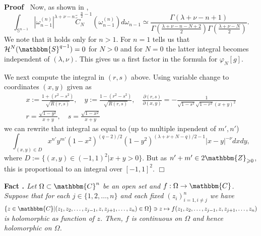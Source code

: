 \documentclass{article}
\newcommand{\assign}{:=}
\newcommand{\tmtextbf}[1]{{\bfseries{#1}}}
\newcommand{\tmtextit}[1]{{\itshape{#1}}}
\newcommand{\tmtextup}[1]{{\upshape{#1}}}
\newenvironment{proof}{\noindent\textbf{Proof\ }}{\hspace*{\fill}$\Box$\medskip}
\numberwithin{definition}{section}
\numberwithin{lemma}{section}
\numberwithin{proposition}{section}
{\theorembodyfont{\rmfamily}\newtheorem{remark}{Remark}
\numberwithin{remark}{section}
}
\begin{document}
\begin{proof}
  Now, as shown in {\cite[lem. 7.6]{kobayashi2015symmetry}},
  \[ \int_{\mathbb{S}^{n - 1}} | \omega_{n - 1}^{(n)} |^{\lambda + \nu - n} 
     \widetilde{\tilde{C}}_N^{\frac{n}{2} - 1} (\omega_{n - 1}^{(n)}) d
     \omega_{n - 1} \simeq \frac{\Gamma ( \lambda + \nu - n + 1)}{\Gamma
     \left( \frac{\lambda + \nu - n - N + 2}{2} \right) \Gamma \left(
     \frac{\lambda + \nu - N}{2} \right)} . \]
  We note that it holds only for $n > 1$. For $n = 1$ {\cite[p.
  6]{howe1993homogeneous}} tells us that $\mathcal{H}^N ( \mathbbm{S}^{q - 1})
  = 0$ for $N > 0$ and for $N = 0$ the latter integral becomes independent of
  $( \lambda, \nu)$. This gives us a first factor in the formula for
  $\varphi_N [ g]$.
  
  We next compute the integral in $( r, s)$ above. Using variable change to
  coordinates $(x, y)$ given as
  \begin{eqnarray}
    & x \assign \frac{1 + (r^2 - s^2)}{\sqrt{R (r, s)}}, \hspace{1em} y
    \assign \frac{1 - (r^2 - s^2)}{\sqrt{R (r, s)}}, \hspace{1em}
    \frac{\partial ( r, s)}{\partial ( x, y)} = - \frac{1}{\sqrt{1 - s^2}
    \sqrt{1 - r^2} ( x + y)^2} &  \nonumber\\
    & r = \frac{\sqrt{1 - y^2}}{x + y}, \hspace{1em} s = \frac{\sqrt{1 -
    x^2}}{x + y} &  \nonumber
  \end{eqnarray}
  we can rewrite that integral as equal to (up to multiple inpendent of $m',
  n'$)
  \[ \int_{( x, y) \in D} x^{n'} y^{m'} ( 1 - x^2)^{( q - 2) / 2} ( 1 -
     y^2)^{( \lambda + \nu + N - q) / 2 - 1} | x - y |^{- \nu} d x d y, \]
  where $D \assign \{ ( x, y) \in ( - 1, 1)^2 | x + y > 0 \}$. But as $n' + m'
  \in 2\mathbbm{Z}_{\geqslant 0}$, this is proportional to an integral over $[
  - 1, 1]^2$.
\end{proof}

{\noindent}\tmtextbf{Fact \tmtextup{19}.
}\tmtextit{\label{k-finite:fact-hartogs}{\cite[thm.
1.2.5]{krantz1982function}} Let $\Omega \subset \mathbbm{C}^n$ be an open set
and $f : \Omega \rightarrow \mathbbm{C}$. Suppose that for each $j \in \{ 1,
2, \ldots, n \}$ and each fixed $( z_i)_{i = 1, i \neq j}^n$ we have $\{ z \in
\mathbbm{C} | ( z_1, z_2, \ldots, z_{j - 1}, z, z_{j + 1}, \ldots, z_n) \in
\Omega \} \ni z \mapsto f ( z_1, z_2, \ldots, z_{j - 1}, z, z_{j + 1}, \ldots,
z_n)$ is holomorphic as function of $z$. Then, $f$ is continuous on $\Omega$
and hence holomorphic on $\Omega$.}{\hspace*{\fill}}{\medskip}
\end{document}
